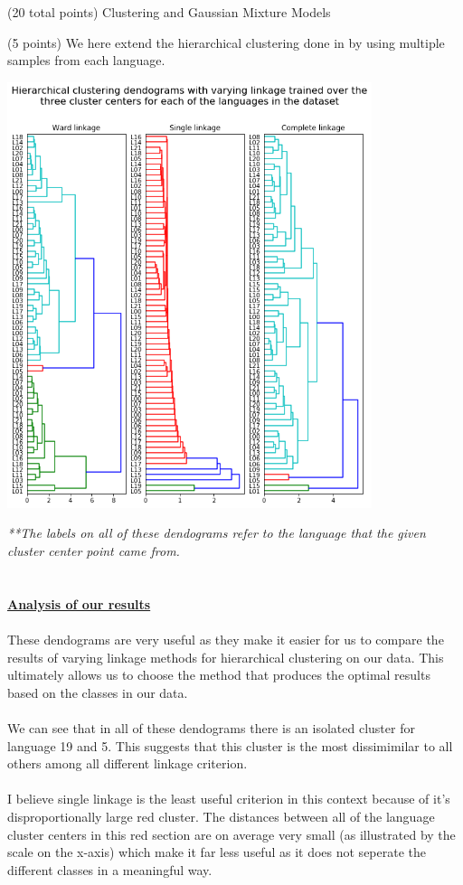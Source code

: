 \documentclass[12pt]{article}
\begin{document}
\begin{question}{(20 total points) Clustering and Gaussian Mixture Models}
\begin{subquestion}{(5 points)
       We here extend the hierarchical clustering done in  by
       using multiple samples from each language.
     }
      \begin{answerbox}{54em}
        \begin{center}
        \includegraphics[width=0.8\textwidth]{images/q34.png}
        \end{center}
        \scriptsize{
        \emph{**The labels on all of these dendograms refer to the language that the given cluster center point came from.}\\
\\
\\
        \textbf{\footnotesize{\underline{Analysis of our results}}}\\
\\
        These dendograms are very useful as they make it easier for us to compare the results of varying linkage methods for hierarchical clustering on our data. This ultimately allows us to choose the method that produces the optimal results based on the classes in our data.\\
\\
        We can see that in all of these dendograms there is an isolated cluster for language 19 and 5. This suggests that this cluster is the most dissimimilar to all others among all different linkage criterion.\\
\\
        I believe single linkage is the least useful criterion in this context because of it's disproportionally large red cluster. The distances between all of the language cluster centers in this red section are on average very small (as illustrated by the scale on the x-axis) which make it far less useful as it does not seperate the different classes in a meaningful way.\\
}
\end{answerbox}
\end{subquestion}
\end{question}
\end{document}
